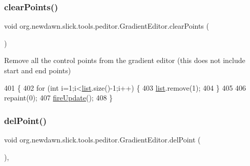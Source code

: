 \subsubsection{\texorpdfstring{clear\+Points()}{clearPoints()}}
{\footnotesize\ttfamily void org.\+newdawn.\+slick.\+tools.\+peditor.\+Gradient\+Editor.\+clear\+Points (\begin{DoxyParamCaption}{ }\end{DoxyParamCaption})\hspace{0.3cm}{\ttfamily [inline]}}

Remove all the control points from the gradient editor (this does not include start and end points) 
\begin{DoxyCode}
401                               \{
402         \textcolor{keywordflow}{for} (\textcolor{keywordtype}{int} i=1;i<\mbox{\hyperlink{classorg_1_1newdawn_1_1slick_1_1tools_1_1peditor_1_1_gradient_editor_aa53704ef8438035eb76c8c6aab8af133}{list}}.size()-1;i++) \{
403             \mbox{\hyperlink{classorg_1_1newdawn_1_1slick_1_1tools_1_1peditor_1_1_gradient_editor_aa53704ef8438035eb76c8c6aab8af133}{list}}.remove(1);
404         \}
405         
406         repaint(0);
407         \mbox{\hyperlink{classorg_1_1newdawn_1_1slick_1_1tools_1_1peditor_1_1_gradient_editor_aaafac407b447cb37d6f3c204681382bd}{fireUpdate}}();
408     \}
\end{DoxyCode}
\mbox{\label{classorg_1_1newdawn_1_1slick_1_1tools_1_1peditor_1_1_gradient_editor_a0dad4490da85f874d00d6295abf3a58d}} 
\subsubsection{\texorpdfstring{del\+Point()}{delPoint()}}
{\footnotesize\ttfamily void org.\+newdawn.\+slick.\+tools.\+peditor.\+Gradient\+Editor.\+del\+Point (\begin{DoxyParamCaption}{ }\end{DoxyParamCaption})\hspace{0.3cm}{\ttfamily [inline]}, {\ttfamily [private]}}

